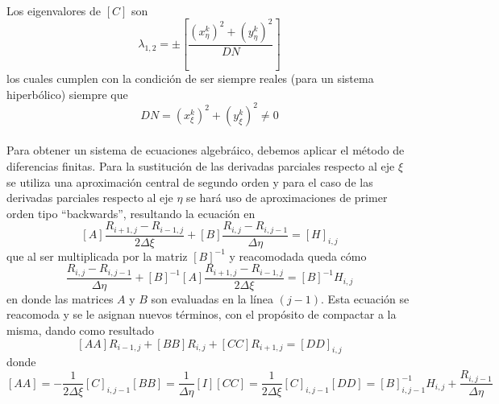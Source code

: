 \documentclass[letterpaper, openright, 12pt]{book}
\begin{document}
	\paragraph*{}
		Los eigenvalores de $\left[ C \right]$ son
		\begin{equation*}
			\lambda_{1, 2} = \pm \left[ \frac{\left(x_{\eta}^{k} \right)^2 + \left( y_{\eta}^{k} \right)^2} {DN} \right]
		\end{equation*}
		los cuales cumplen con la condición de ser siempre reales (para un sistema hiperbólico) siempre que
		\begin{equation*}
		DN = \left( x_{\xi}^{k} \right)^2 + \left( y_{\xi}^{k} \right)^2 \neq 0
		\end{equation*}
	 \paragraph*{}
		 Para obtener un sistema de ecuaciones algebráico, debemos aplicar el método de diferencias finitas. Para la sustitución de las derivadas parciales respecto al eje $\xi$ se utiliza una aproximación central de segundo orden y para el caso de las derivadas parciales respecto al eje $\eta$ se hará uso de aproximaciones de primer orden tipo ``backwards'', resultando la ecuación en
		 \begin{equation}
			 \left[ A \right] \frac{R_{i + 1, j} - R_{i - 1, j}}{2 \Delta \xi} + \left[ B \right] \frac{R_{i, j} - R_{i, j - 1}}{\Delta \eta} = \left[ H \right]_{i, j}
		 \end{equation}
		 que al ser multiplicada por la matriz $\left[ B \right]^{-1}$ y reacomodada queda cómo
		 \begin{equation}
			 \frac{R_{i, j} - R_{i, j-1} }{\Delta \eta} + \left[ B \right]^{-1} \left[ A \right] \frac{R_{i + 1, j} - R_{i - 1, j} }{2 \Delta \xi} = \left[ B \right]^{-1} H_{i, j}
		 \end{equation}
		 en donde las matrices $A$ y $B$ son evaluadas en la línea $(j - 1)$. Esta ecuación se reacomoda y se le asignan nuevos términos, con el propósito de compactar a la misma, dando como resultado
		 \begin{equation}
			 \left[ AA \right] R_{i - 1, j} + \left[ BB \right] R_{i, j} + \left[ CC \right] R_{i + 1, j} = \left[ DD \right]_{i, j}
			 \label{ec-hyper-final}
		 \end{equation}
		 donde
		 \begin{subequations}
			 	\begin{equation*}
				 	\left[ AA \right] = - \frac{1}{2 \Delta \xi} \left[ C \right]_{i, j - 1}
			 	\end{equation*}
				\begin{equation*}
					\left[ BB \right] = \frac{1}{\Delta \eta} \left[ I \right]
				\end{equation*}
				\begin{equation*}
					\left[ CC \right] = \frac{1}{2 \Delta \xi} \left[ C \right]_{i, j - 1}
				\end{equation*}
				\begin{equation*}
				\left[ DD \right] = \left[ B \right]_{i, j - 1}^{-1} H_{i, j} + \frac{R_{i, j-1}}{\Delta \eta}
				\end{equation*}
			 \end{subequations}
\end{document}
